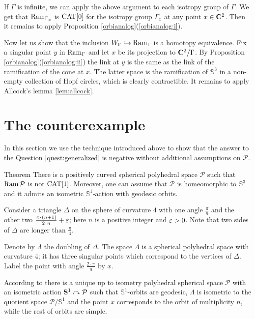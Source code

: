 \documentclass{compositio}
\begin{document}
If $\Gamma$ is infinite, we can apply the above argument to each isotropy group
of $\Gamma$.
We get that $\mathop{\rm Ram}\nolimits_{\Gamma_x}$ is $\mathrm{CAT}[0]$
for the isotropy group $\Gamma_x$ at any point $x\in\mathbf{C}^2$.
Then it remains to apply Proposition \ref{orbianalog}(\ref{orbianalog:i}).

Now let us show that the inclusion $W_\Gamma\hookrightarrow \mathop{\rm Ram}\nolimits_\Gamma$ is a homotopy equivalence.
Fix a singular point $y$ in $\mathop{\rm Ram}\nolimits_\Gamma$
and let $x$ be its projection to $\mathbf{C}^2/\Gamma$.
By Proposition \ref{orbianalog}(\ref{orbianalog:ii})
the link at $y$ is the same as the link of the ramification of the cone at $x$.
The latter space is the ramification of $\mathbb{S}^3$ in a non-empty collection of Hopf circles,
which is clearly contractible.
It remains to apply Allcock's lemma \ref{lem:allcock}.
\qeds

\section{The counterexample}

In this section we use the technique introduced above to show that
the answer to the Question \ref{quest:generalized} is negative
without additional assumptions on $\mathcal{P}$.

\begin{thm}{Theorem}\label{notCAT[1]} There is a positively curved spherical polyhedral space $\mathcal{P}$ 
such that $\mathop{\rm Ram}\nolimits \mathcal{P}$ is not $\mathrm{CAT}[1]$.
Moreover, one can assume that $\mathcal{P}$ is homeomorphic to $\mathbb{S}^3$
and it admits an isometric $\mathbb{S}^1$-action
with geodesic orbits.
\end{thm}

 Consider a triangle $\Delta$ on the sphere of curvature $4$ with one angle $\frac{\pi}{n}$ and the other two $\frac{\pi\cdot(n+1)}{2\cdot n}\z+\varepsilon$;
here $n$ is a positive integer and $\varepsilon>0$.
Note that two sides of $\Delta$
are longer than $\frac{\pi}{4}$.

Denote by $\Lambda$ the doubling of $\Delta$.
The space $\Lambda$ is a spherical polyhedral space with curvature $4$;
it has three singular points which correspond to the vertices of $\Delta$.
Label the point with angle $\frac{2\cdot\pi}{n}$ by $x$.

According to \cite[Theorem 1.8]{panov} there is a unique up to isometry
polyhedral spherical space $\mathcal{P}$
with an isometric action $\mathbf{S}^1\curvearrowright\mathcal{P}$
such that $\mathbb{S}^1$-orbits are geodesic,
$\Lambda$ is isometric to the quotient space $\mathcal{P}/\mathbb{S}^1$
and the point $x$ corresponds to the orbit of multiplicity $n$,
while the rest of orbits are simple.
\end{document}
